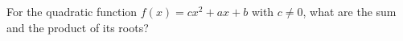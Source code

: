 For the quadratic function $f(x)=cx^2+ax+b$ with $c\ne0$, what are the sum and the product of its roots?
